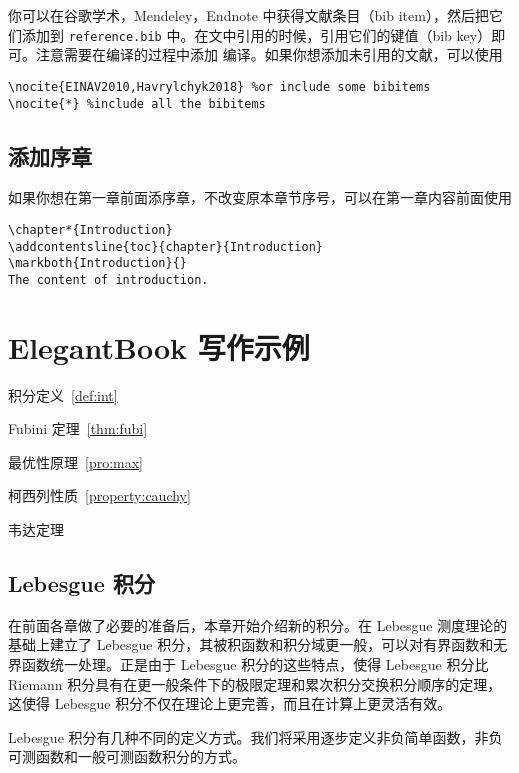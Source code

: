 \documentclass[cn,11pt,fancy,hide,pad]{elegantbook}
\begin{document}
你可以在谷歌学术，Mendeley，Endnote 中获得文献条目（bib item），然后把它们添加到 \lstinline{reference.bib} 中。在文中引用的时候，引用它们的键值（bib key）即可。注意需要在编译的过程中添加  编译。如果你想添加未引用的文献，可以使用
\begin{lstlisting}[frame=single]
\nocite{EINAV2010,Havrylchyk2018} %or include some bibitems
\nocite{*} %include all the bibitems
\end{lstlisting}

\section{添加序章}

如果你想在第一章前面添序章，不改变原本章节序号，可以在第一章内容前面使用 
\begin{lstlisting}
\chapter*{Introduction}
\addcontentsline{toc}{chapter}{Introduction} 
\markboth{Introduction}{} 
The content of introduction.
\end{lstlisting}

\chapter{ElegantBook 写作示例}

\begin{introduction}
\item 积分定义~\ref{def:int}
\item Fubini 定理~\ref{thm:fubi}
\item 最优性原理~\ref{pro:max}
\item 柯西列性质~\ref{property:cauchy}
\item 韦达定理
\end{introduction}

\section{Lebesgue 积分}
在前面各章做了必要的准备后，本章开始介绍新的积分。在 Lebesgue 测度理论的基础上建立了 Lebesgue 积分，其被积函数和积分域更一般，可以对有界函数和无界函数统一处理。正是由于 Lebesgue 积分的这些特点，使得 Lebesgue 积分比 Riemann 积分具有在更一般条件下的极限定理和累次积分交换积分顺序的定理，这使得 Lebesgue 积分不仅在理论上更完善，而且在计算上更灵活有效。

Lebesgue 积分有几种不同的定义方式。我们将采用逐步定义非负简单函数，非负可测函数和一般可测函数积分的方式。
\end{document}
